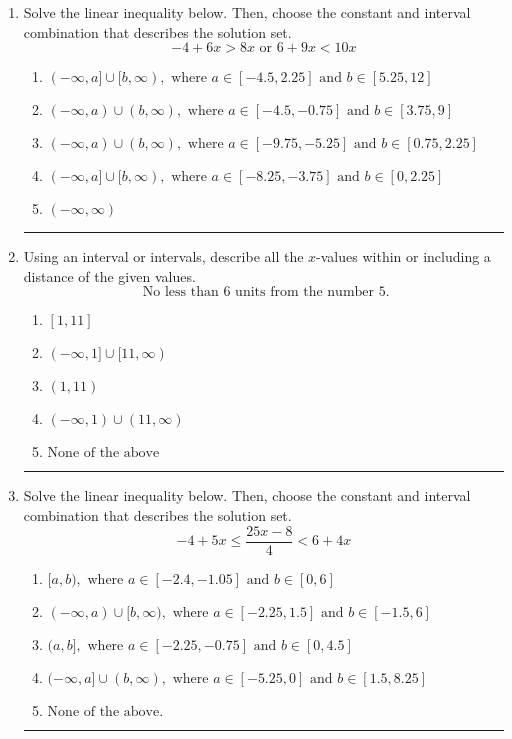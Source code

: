 \documentclass[14pt]{extbook}
\newcommand{\litem}[1]{\item#1\hspace*{-1cm}\rule{\textwidth}{0.4pt}}
\begin{document}
\begin{enumerate}
{\begin{enumerate}[label=\Alph*.]
\end{enumerate} }
\litem{
Solve the linear inequality below. Then, choose the constant and interval combination that describes the solution set.\[ -4 + 6 x > 8 x \text{ or } 6 + 9 x < 10 x \]\begin{enumerate}[label=\Alph*.]
\item \( (-\infty, a] \cup [b, \infty), \text{ where } a \in [-4.5, 2.25] \text{ and } b \in [5.25, 12] \)
\item \( (-\infty, a) \cup (b, \infty), \text{ where } a \in [-4.5, -0.75] \text{ and } b \in [3.75, 9] \)
\item \( (-\infty, a) \cup (b, \infty), \text{ where } a \in [-9.75, -5.25] \text{ and } b \in [0.75, 2.25] \)
\item \( (-\infty, a] \cup [b, \infty), \text{ where } a \in [-8.25, -3.75] \text{ and } b \in [0, 2.25] \)
\item \( (-\infty, \infty) \)

\end{enumerate} }
\litem{
Using an interval or intervals, describe all the $x$-values within or including a distance of the given values.\[ \text{ No less than } 6 \text{ units from the number } 5. \]\begin{enumerate}[label=\Alph*.]
\item \( [1, 11] \)
\item \( (-\infty, 1] \cup [11, \infty) \)
\item \( (1, 11) \)
\item \( (-\infty, 1) \cup (11, \infty) \)
\item \( \text{None of the above} \)

\end{enumerate} }
\litem{
Solve the linear inequality below. Then, choose the constant and interval combination that describes the solution set.\[ -4 + 5 x \leq \frac{25 x - 8}{4} < 6 + 4 x \]\begin{enumerate}[label=\Alph*.]
\item \( [a, b), \text{ where } a \in [-2.4, -1.05] \text{ and } b \in [0, 6] \)
\item \( (-\infty, a) \cup [b, \infty), \text{ where } a \in [-2.25, 1.5] \text{ and } b \in [-1.5, 6] \)
\item \( (a, b], \text{ where } a \in [-2.25, -0.75] \text{ and } b \in [0, 4.5] \)
\item \( (-\infty, a] \cup (b, \infty), \text{ where } a \in [-5.25, 0] \text{ and } b \in [1.5, 8.25] \)
\item \( \text{None of the above.} \)


\end{enumerate}}
\end{enumerate}
\end{document}
